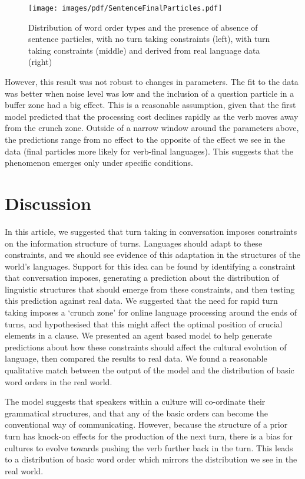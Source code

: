 \documentclass[12pt]{article}
\begin{document}
\begin{figure}[htbp]
\begin{center}
\texttt{[image: images/pdf/SentenceFinalParticles.pdf]}
\caption{Distribution of word order types and the presence of absence of sentence particles, with no turn taking constraints (left), with turn taking constraints (middle) and derived from real language data (right)}
\label{fig:SParticles}
\end{center}
\end{figure}

However, this result was not robust to changes in parameters.  The fit to the data was better when noise level was low and the inclusion of a question particle in a buffer zone had a big effect.  This is a reasonable assumption, given that the first model predicted that the processing cost declines rapidly as the verb moves away from the crunch zone.  Outside of a narrow window around the parameters above, the predictions range from no effect to the opposite of the effect we see in the data (final particles more likely for verb-final languages).  This suggests that the phenomenon emerges only under specific conditions.    


\section{Discussion}

In this article, we suggested that turn taking in conversation imposes constraints on the information structure of turns.  Languages should adapt to these constraints, and we should see evidence of this adaptation in the structures of the world's languages.  Support for this idea can be found by identifying a constraint that conversation imposes, generating a prediction about the distribution of linguistic structures that should emerge from these constraints, and then testing this prediction against real data.  We suggested that the need for rapid turn taking imposes a `crunch zone' for online language processing around the ends of turns, and hypothesised that this might affect the optimal position of crucial elements in a clause.  We presented an agent based model to help generate predictions about how these constraints should affect the cultural evolution of language, then compared the results to real data.  We found a reasonable qualitative match between the output of the model and the distribution of basic word orders in the real world.

The model suggests that speakers within a culture will co-ordinate their grammatical structures, and that any of the basic orders can become the conventional way of communicating.  However, because the structure of a prior turn has knock-on effects for the production of the next turn, there is a bias for cultures to evolve towards pushing the verb further back in the turn.  This leads to a distribution of basic word order which mirrors the distribution we see in the real world.
\end{document}
